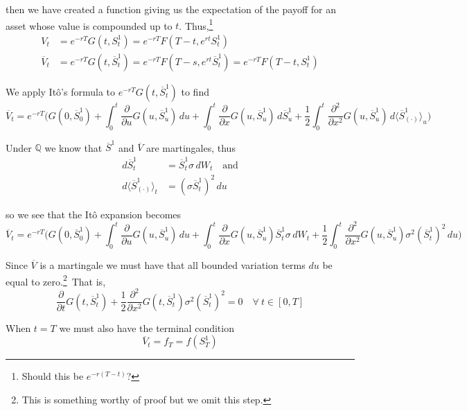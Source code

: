\documentclass[12pt]{article}
\newlength\tindent
\renewcommand{\indent}{\hspace*{\tindent}}
\begin{document}
then we have created a function giving us the expectation of the payoff for an asset whose value is compounded up to $t$. Thus,\footnote{Should this be $e^{-r(T - t)}$?}
\begin{align*}
	V_t &= e^{-rT}G(t, S^1_t) = e^{-rT}F(T - t,e^{rt}S^1_t) \\
	\overline{V}_t &= e^{-rT}G(t,\overline{S}^1_t) = e^{-rT}F(T - s, e^{rt}\overline{S}^1_t) = e^{-rT}F(T - t,S^1_t)
\end{align*}


We apply It\^{o}'s formula to $e^{-rT}G(t,\overline{S}^1_t)$ to find
\begin{equation*}
	\overline{V}_t = e^{-rT}\Big(G(0,\overline{S}^1_0) + \int^t_0 \frac{\partial}{\partial u} G(u, \overline{S}^1_u)\,du + \int^t_0 \frac{\partial}{\partial x} G(u,\overline{S}^1_u)\,d\overline{S}^1_u + \frac{1}{2}\int^t_0 \frac{\partial^2}{\partial x^2} G(u, \overline{S}^1_u)\,d\langle \overline{S}^1_{(\cdot)}\rangle_u \Big)
\end{equation*}

Under $\mathbb Q$ we know that $\overline{S}^1$ and $\overline{V}$ are martingales, thus
\begin{align*}
	d\overline{S}^1_t &= \overline{S}^1_t \sigma \,dW_t \quad \text{and} \\
	d\langle \overline{S}^1_{(\cdot)}\rangle_t &= (\sigma\overline{S}^1_t)^2\,du
\end{align*}

so we see that the It\^{o} expansion becomes
\begin{equation*}
	\overline{V}_t = e^{-rT}\Big(G(0,\overline{S}^1_0) + \int^t_0 \frac{\partial}{\partial u} G(u, \overline{S}^1_u)\,du + \int^t_0 \frac{\partial}{\partial x} G(u,\overline{S}^1_u)\overline{S}^1_t \sigma \,dW_t + \frac{1}{2}\int^t_0 \frac{\partial^2}{\partial x^2} G(u, \overline{S}^1_u)\sigma^2(\overline{S}^1_t)^2\,du \Big)
\end{equation*}

\indent Since $\overline{V}$ is a martingale we must have that all bounded variation terms $du$ be equal to zero.\footnote{This is something worthy of proof but we omit this step.}~That is,
\begin{equation*}
	\frac{\partial}{\partial t}G(t,\overline{S}^1_t) + \frac{1}{2}\frac{\partial^2}{\partial x^2}G(t,\overline{S}^1_t)\sigma^2(\overline{S}^1_t)^2 = 0 \quad \forall~t\in[0,T]
\end{equation*}

When $t = T$ we must also have the terminal condition 
\begin{equation*}
	\overline{V}_t = f_T = f(S^1_T)
\end{equation*}
\end{document}
